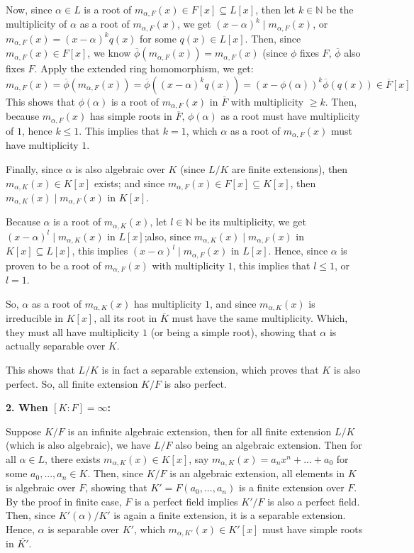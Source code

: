 \documentclass{article}
\begin{document}
Now, since $\alpha\in L$ is a root of $m_{\alpha,F}(x)\in F[x]\subseteq L[x]$, then let $k\in\mathbb{N}$ be the multiplicity of $\alpha$ as a root of $m_{\alpha,F}(x)$, we get $(x-\alpha)^k\mid m_{\alpha,F}(x)$, or $m_{\alpha,F}(x)=(x-\alpha)^kq(x)$ for some $q(x)\in L[x]$. Then, since $m_{\alpha,F}(x)\in F[x]$, we know $\overline{\phi}(m_{\alpha,F}(x)) = m_{\alpha,F}(x)$ (since $\phi$ fixes $F$, $\overline{\phi}$ also fixes $F$. Apply the extended ring homomorphism, we get:
$$m_{\alpha,F}(x)=\overline{\phi}(m_{\alpha,F}(x))=\overline{\phi}((x-\alpha)^kq(x)) = (x-\phi(\alpha))^k\overline{\phi}(q(x))\in \overline{F}[x]$$
This shows that $\phi(\alpha)$ is a root of $m_{\alpha,F}(x)$ in $\overline{F}$ with multiplicity $\geq k$. Then, because $m_{\alpha,F}(x)$ has simple roots in $\overline{F}$, $\phi(\alpha)$ as a root must have multiplicity of $1$, hence $k\leq 1$. This implies that $k=1$, which $\alpha$ as a root of $m_{\alpha,F}(x)$ must have multiplicity $1$.

\hfil

Finally, since $\alpha$ is also algebraic over $K$ (since $L/K$ are finite extensions), then $m_{\alpha, K}(x)\in K[x]$ exists; and since $m_{\alpha,F}(x)\in F[x]\subseteq K[x]$, then $m_{\alpha,K}(x)\mid m_{\alpha,F}(x)$ in $K[x]$.

Because $\alpha$ is a root of $m_{\alpha,K}(x)$, let $l\in \mathbb{N}$ be its multiplicity, we get $(x-\alpha)^l\mid m_{\alpha,K}(x)$ in $L[x]$;also, since $m_{\alpha,K}(x)\mid m_{\alpha,F}(x)$ in $K[x]\subseteq L[x]$, this implies $(x-\alpha)^l\mid m_{\alpha,F}(x)$ in $L[x]$. Hence, since $\alpha$ is proven to be a root of $m_{\alpha,F}(x)$ with multiplicity $1$, this implies that $l\leq 1$, or $l=1$.

So, $\alpha$ as a root of $m_{\alpha,K}(x)$ has multiplicity $1$, and since $m_{\alpha,K}(x)$ is irreducible in $K[x]$, all its root in $\overline{K}$ must have the same multiplicity. Which, they must all have multiplicity $1$ (or being a simple root), showing that $\alpha$ is actually separable over $K$.

This shows that $L/K$ is in fact a separable extension, which proves that $K$ is also perfect. So, all finite extension $K/F$ is also perfect.

\hfil

\textbf{2. When $[K:F]=\infty$:}

Suppose $K/F$ is an infinite algebraic extension, then for all finite extension $L/K$ (which is also algebraic), we have $L/F$ also being an algebraic extension. Then for all $\alpha \in L$, there exists $m_{\alpha,K}(x)\in K[x]$, say $m_{\alpha,K}(x)=a_nx^n+...+a_0$ for some $a_0,...,a_n\in K$. Then, since $K/F$ is an algebraic extension, all elements in $K$ is algebraic over $F$, showing that $K'=F(a_0,...,a_n)$ is a finite extension over $F$. By the proof in finite case, $F$ is a perfect field implies $K'/F$ is also a perfect field. Then, since $K'(\alpha)/K'$ is again a finite extension, it is a separable extension. Hence, $\alpha$ is separable over $K'$, which $m_{\alpha,K'}(x)\in K'[x]$ must have simple roots in $\overline{K'}$.
\end{document}
